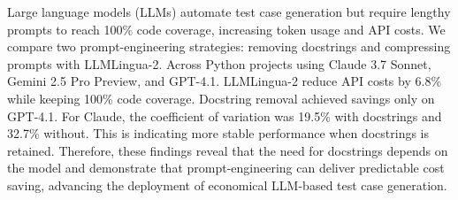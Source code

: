 

Large language models (LLMs) automate test case generation but require lengthy prompts to reach 100\% code coverage, increasing token usage and API costs. We compare two prompt-engineering strategies: removing docstrings and compressing prompts with LLMLingua-2. Across Python projects using Claude 3.7 Sonnet, Gemini 2.5 Pro Preview, and GPT-4.1. LLMLingua-2 reduce API costs by 6.8\% while keeping 100\% code coverage. Docstring removal achieved savings only on GPT-4.1. For Claude, the coefficient of variation was 19.5\% with docstrings and 32.7\% without. This is indicating more stable performance when docstrings is retained. Therefore, these findings reveal that the need for docstrings depends on the model and demonstrate that prompt-engineering can deliver predictable cost saving, advancing the deployment of economical LLM-based test case generation.

